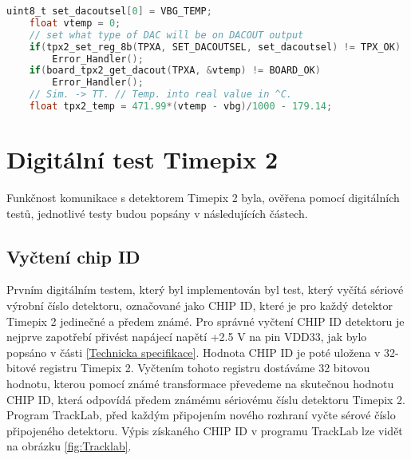 \begin{lstlisting}[frame=single, language=C, caption={Výběr výstupu DACOUT detektoru Timepix2 a odečtení hodnoty detektoru.}, label=kod_temp_tpx2]
	uint8_t set_dacoutsel[0] = VBG_TEMP; 
	float vtemp = 0;
	// set what type of DAC will be on DACOUT output								   
	if(tpx2_set_reg_8b(TPXA, SET_DACOUTSEL, set_dacoutsel) != TPX_OK)   
		Error_Handler();
	if(board_tpx2_get_dacout(TPXA, &vtemp) != BOARD_OK)
		Error_Handler();
	// Sim. -> TT. // Temp. into real value in ^C.
	float tpx2_temp = 471.99*(vtemp - vbg)/1000 - 179.14;					
\end{lstlisting}

\section{Digitální test Timepix 2} %
Funkčnost komunikace s detektorem Timepix 2 byla, ověřena pomocí digitálních testů, jednotlivé testy budou popsány v následujících částech.
	\subsection{Vyčtení chip ID}
	Prvním digitálním testem, který byl implementován byl test, který vyčítá sériové výrobní číslo detektoru, označované jako CHIP ID, které je pro každý detektor Timepix 2 jedinečné a předem známé. Pro správné vyčtení CHIP ID detektoru je nejprve zapotřebí přivést napájecí napětí +2.5 V na pin VDD33, jak bylo popsáno v části \ref{Technicka specifikace}. Hodnota CHIP ID je poté uložena v 32-bitové registru Timepix 2. Vyčtením tohoto registru dostáváme 32 bitovou hodnotu, kterou pomocí známé transformace převedeme na skutečnou hodnotu CHIP ID, která odpovídá předem známému sériovému číslu detektoru Timepix 2. Program TrackLab, před každým připojením nového rozhraní vyčte sérové číslo připojeného detektoru. Výpis získaného CHIP ID v programu TrackLab lze vidět na obrázku \ref{fig:Tracklab}.

